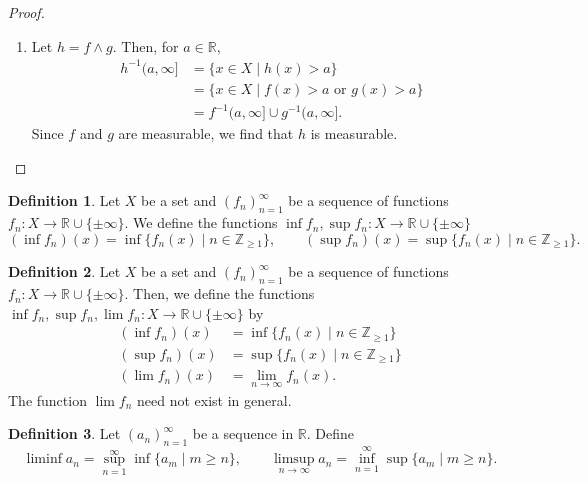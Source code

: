 \documentclass[a4paper, openany]{memoir}
\theoremstyle{definition}
\newtheorem{definition}{Definition}[section]
\theoremstyle{plain}
\begin{document}
\begin{proof}
\begin{enumerate}
            \item Let $h = f \land g$. Then, for $a \in \mathbb{R}$,
            \begin{align*}
                h^{-1}(a, \infty] &= \{x \in X \mid h(x) > a\} \\
                &= \{x \in X \mid f(x) > a \textrm{ or } g(x) > a\} \\
                &= f^{-1}(a, \infty] \cup g^{-1}(a, \infty].
            \end{align*}
            Since $f$ and $g$ are measurable, we find that $h$ is measurable.
        \end{enumerate}
    \end{proof}

    \begin{definition}
        Let $X$ be a set and $(f_n)_{n=1}^\infty$ be a sequence of functions $f_n \colon X \to \mathbb{R} \cup \{\pm \infty\}$. We define the functions $\inf f_n, \sup f_n \colon X \to \mathbb{R} \cup \{\pm \infty\}$
        \[(\inf f_n)(x) = \inf \{f_n(x) \mid n \in \mathbb{Z}_{\geq 1}\}, \qquad (\sup f_n)(x) = \sup \{f_n(x) \mid n \in \mathbb{Z}_{\geq 1}\}.\]
    \end{definition}

    \begin{definition}
        Let $X$ be a set and $(f_n)_{n=1}^\infty$ be a sequence of functions $f_n \colon X \to \mathbb{R} \cup \{\pm \infty\}$. Then, we define the functions $\inf f_n, \sup f_n, \lim f_n \colon X \to \mathbb{R} \cup \{\pm \infty\}$ by
        \begin{align*}
            (\inf f_n) (x) &= \inf \{f_n(x) \mid n \in \mathbb{Z}_{\geq 1}\} \\
            (\sup f_n) (x) &= \sup \{f_n(x) \mid n \in \mathbb{Z}_{\geq 1}\} \\
            (\lim f_n) (x) &= \lim_{n \to \infty} f_n(x). 
        \end{align*}
        The function $\lim f_n$ need not exist in general.
    \end{definition}

    \begin{definition}
        Let $(a_n)_{n=1}^\infty$ be a sequence in $\mathbb{R}$. Define
        \[\liminf a_n = \sup_{n=1}^\infty \inf \{a_m \mid m \geq n\}, \qquad \limsup_{n \to \infty} a_n = \inf_{n=1}^\infty \sup \{a_m \mid m \geq n\}.\]
    \end{definition}
\end{document}
